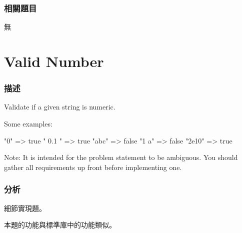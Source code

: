 \subsubsection{相關題目}
\begindot
\item 無
\myenddot


\section{Valid Number} %
\label{sec:valid-number}


\subsubsection{描述}
Validate if a given string is numeric.

Some examples:
\begin{Code}
"0" => true
" 0.1 " => true
"abc" => false
"1 a" => false
"2e10" => true
\end{Code}

Note: It is intended for the problem statement to be ambiguous. You should gather all requirements up front before implementing one.


\subsubsection{分析}
細節實現題。

本題的功能與標準庫中的功能類似。


